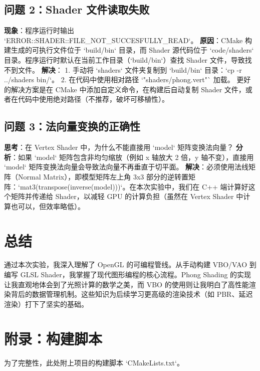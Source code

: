 \documentclass[a4paper]{article}
\begin{document}
\subsection{问题 2：Shader 文件读取失败}
\textbf{现象}：程序运行时输出 `ERROR::SHADER::FILE_NOT_SUCCESFULLY_READ`。
\textbf{原因}：CMake 构建生成的可执行文件位于 `build/bin` 目录，而 Shader 源代码位于 `code/shaders` 目录。程序运行时默认在当前工作目录（`build/bin`）查找 Shader 文件，导致找不到文件。
\textbf{解决}：
1. 手动将 `shaders` 文件夹复制到 `build/bin` 目录：`cp -r ../shaders bin/`。
2. 在代码中使用相对路径 `"shaders/phong.vert"` 加载。
更好的解决方案是在 CMake 中添加自定义命令，在构建后自动复制 Shader 文件，或者在代码中使用绝对路径（不推荐，破坏可移植性）。

\subsection{问题 3：法向量变换的正确性}
\textbf{思考}：在 Vertex Shader 中，为什么不能直接用 `model` 矩阵变换法向量？
\textbf{分析}：如果 `model` 矩阵包含非均匀缩放（例如 x 轴放大 2 倍，y 轴不变），直接用 `model` 矩阵变换法向量会导致法向量不再垂直于切平面。
\textbf{解决}：必须使用法线矩阵（Normal Matrix），即模型矩阵左上角 3x3 部分的逆转置矩阵：`mat3(transpose(inverse(model)))`。在本次实验中，我们在 C++ 端计算好这个矩阵并传递给 Shader，以减轻 GPU 的计算负担（虽然在 Vertex Shader 中计算也可以，但效率略低）。

\section{总结}
通过本次实验，我深入理解了 OpenGL 的可编程管线。从手动构建 VBO/VAO 到编写 GLSL Shader，我掌握了现代图形编程的核心流程。Phong Shading 的实现让我直观地体会到了光照计算的数学之美，而 VBO 的使用则让我明白了高性能渲染背后的数据管理机制。这些知识为后续学习更高级的渲染技术（如 PBR、延迟渲染）打下了坚实的基础。

\newpage
\appendix
\section{附录：构建脚本}

为了完整性，此处附上项目的构建脚本 `CMakeLists.txt`。
\end{document}
